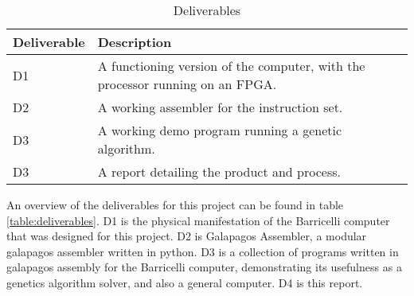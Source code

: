  \begin{table}[h]
 \begin{center}
 \begin{tabular}{| l | l |}
 \hline
 Deliverable & Description \\
 \hline
 D1 & A functioning version of the computer, with the processor running on an FPGA.\\
 D2 & A working assembler for the instruction set.\\
 D3 & A working demo program running a genetic algorithm.\\
 D3 & A report detailing the product and process.\\
 \hline
 \end{tabular}
 \caption{Deliverables}
 \label{table:deliverables}
 \end{center}
 \end{table}

An overview of the deliverables for this project can be found in table \vref{table:deliverables}.
D1 is the physical manifestation of the Barricelli computer that was designed for this project.
D2 is Galapagos Assembler, a modular \gls{galapagos} assembler written in python.
D3 is a collection of programs written in galapagos assembly for the Barricelli computer, demonstrating its usefulness as a genetics algorithm solver, and also a general computer.
D4 is this report.
